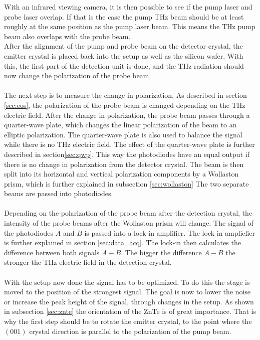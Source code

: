 With an infrared viewing camera, it is then possible to see if the pump laser and probe laser overlap.
If that is the case the pump $\si{\tera\hertz}$ beam should be at least roughly at the same position as the pump laser beam.
This means the $\si{\tera\hertz}$ pump beam also overlaps with the probe beam.
\\
After the alignment of the pump and probe beam on the detector crystal, the emitter crystal is placed back into the setup as well as the silicon wafer.
With this, the first part of the detection unit is done, and the $\si{\tera\hertz}$ radiation should now change the polarization of the probe beam.
\\\\
The next step is to measure the change in polarization.
As described in section \ref{sec:eos}, the polarization of the probe beam is changed depending on the $\si{\tera\hertz}$ electric field.
After the change in polarization, the probe beam passes through a quarter-wave plate, which changes the linear polarization of the beam to an elliptic polarization.
The quarter-wave plate is also used to balance the signal while there is no $\si{\tera\hertz}$ electric field.
The effect of the quarter-wave plate is further described in section\ref{sec:qwp}.
This way the photodiodes have an equal output if there is no change in polarization from the detector crystal.
The beam is then split into its horizontal and vertical polarization components by a Wollaston prism, which is further explained in subsection \ref{sec:wollaston}
The two separate beams are passed into photodiodes.
\\\\
Depending on the polarization of the probe beam after the detection crystal, the intensity of the probe beams after the Wollaston prism will change.
The signal of the photodiodes $A$ and $B$ is passed into a lock-in amplifier.
The lock in ampliefier is further explained in section \ref{sec:data_acq}.
The lock-in then calculates the difference between both signals $A-B$.
The bigger the difference $A-B$ the stronger the $\si{\tera\hertz}$ electric field in the detection crystal.
\\\\
With the setup now done the signal has to be optimized.
To do this the stage is moved to the position of the strongest signal.
The goal is now to lower the noise or increase the peak height of the signal, through changes in the setup.
As shown in subsection \ref{sec:znte} the orientation of the ZnTe is of great importance.
That is why the first step should be to rotate the emitter crystal, to the point where the $(001)$ crystal direction is parallel to the polarization of the pump beam.
